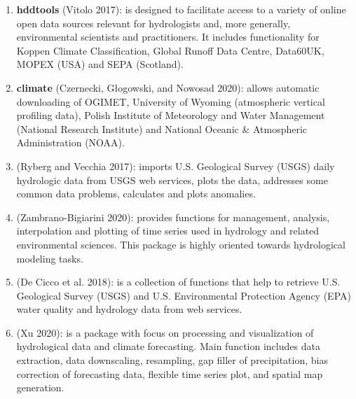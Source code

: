 \begin{enumerate}
\def\labelenumi{\arabic{enumi}.}
\item
  \textbf{hddtools} (Vitolo 2017): is designed to facilitate
  access to a variety of online open data sources relevant for
  hydrologists and, more generally, environmental scientists and
  practitioners. It includes functionality for Koppen Climate
  Classification, Global Runoff Data Centre, Data60UK, MOPEX (USA) and
  SEPA (Scotland).
\item
  \textbf{climate} (Czernecki, Głogowski, and Nowosad 2020): allows automatic downloading
  of OGIMET, University of Wyoming (atmospheric vertical profiling
  data), Polish Institute of Meteorology and Water Management
  (National Research Institute) and National Oceanic \& Atmospheric
  Administration (NOAA).
\item
   (Ryberg and Vecchia 2017): imports U.S. Geological
  Survey (USGS) daily hydrologic data from USGS web services, plots
  the data, addresses some common data problems, calculates and plots
  anomalies.
\item
   (Zambrano-Bigiarini 2020): provides functions for
  management, analysis, interpolation and plotting of time series used
  in hydrology and related environmental sciences. This package is
  highly oriented towards hydrological modeling tasks.
\item
   (De Cicco et al. 2018): is a collection of
  functions that help to retrieve U.S. Geological Survey (USGS) and U.S.
  Environmental Protection Agency (EPA) water quality and hydrology
  data from web services.
\item
   (Xu 2020): is a package with focus on
  processing and visualization of hydrological data and
  climate forecasting.
  Main function includes data extraction, data downscaling,
  resampling, gap filler of precipitation, bias correction of
  forecasting data, flexible time series plot, and spatial map
  generation.
\end{enumerate}

